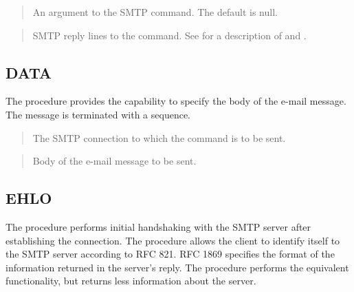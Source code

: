 \documentclass[letterpaper,10pt,english,openany,oneside]{sphinxmanual}
\begin{document}
\begin{quote}

An argument to the SMTP command. The default is null.
\end{quote}

\begin{quote}

SMTP reply lines to the command. See {\hyperref[\detokenize{utl_smtp:reply-replies}]{}} for a description
of  and .
\end{quote}


\subsection{DATA}
\label{\detokenize{utl_smtp:data}}
The  procedure provides the capability to specify the body of the
e-mail message. The message is terminated with a 
sequence.
\begin{quote}

\end{quote}


\begin{quote}

The SMTP connection to which the command is to be sent.
\end{quote}

\begin{quote}

Body of the e-mail message to be sent.
\end{quote}

\newpage


\subsection{EHLO}
\label{\detokenize{utl_smtp:ehlo}}
The  procedure performs initial handshaking with the SMTP server
after establishing the connection. The  procedure allows the client
to identify itself to the SMTP server according to RFC 821. RFC 1869
specifies the format of the information returned in the server’s reply.
The  procedure performs the equivalent functionality, but returns
less information about the server.
\begin{quote}

\end{quote}
\end{document}
